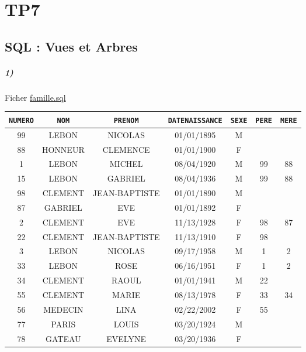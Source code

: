 \documentclass{report}
\begin{document}

\chapter{TP7}

\section{SQL : Vues et Arbres}

\paragraph{1)}Ficher \href{./TP7/famille.sql}{famille.sql}

\begin{table}[H]
	\center
	\begin{tabular}{|c|c|c|c|c|c|c|}
		\hline
		\verb+NUMERO+ & \verb+NOM+ & \verb+PRENOM+ & \verb+DATENAISSANCE+ & \verb+SEXE+ & \verb+PERE+ & \verb+MERE+ \\
		\hline
		99 & LEBON & NICOLAS & 01/01/1895 & M & & \\
		\hline
		88 & HONNEUR & CLEMENCE & 01/01/1900 & F & & \\
		\hline
		1 & LEBON & MICHEL & 08/04/1920 & M & 99 & 88 \\
		\hline
		15 & LEBON & GABRIEL & 08/04/1936 & M & 99 & 88 \\
		\hline
		98 & CLEMENT & JEAN-BAPTISTE & 01/01/1890 & M & & \\
		\hline
		87 & GABRIEL & EVE & 01/01/1892 & F & &  \\
		\hline
		2 & CLEMENT & EVE & 11/13/1928 & F & 98 & 87 \\
		\hline
		22 & CLEMENT & JEAN-BAPTISTE & 11/13/1910 & F & 98 & \\
		\hline
		3 & LEBON & NICOLAS & 09/17/1958 & M & 1 & 2 \\
		\hline
		33 & LEBON & ROSE & 06/16/1951 & F & 1 & 2 \\
		\hline
		34 & CLEMENT & RAOUL & 01/01/1941 & M & 22 & \\
		\hline
		55 & CLEMENT & MARIE & 08/13/1978 & F & 33 & 34 \\
		\hline
		56 & MEDECIN & LINA & 02/22/2002 & F & 55 & \\
		\hline
		77 & PARIS & LOUIS & 03/20/1924 & M & & \\
		\hline
		78 & GATEAU & EVELYNE & 03/20/1936 & F & & \\

\end{tabular}
\end{table}
\end{document}
